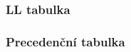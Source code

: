 \begin{frame} 
  \frametitle{LL tabulka}
\end{frame}


\begin{frame} 
  \frametitle{Precedenční tabulka}
\end{frame}